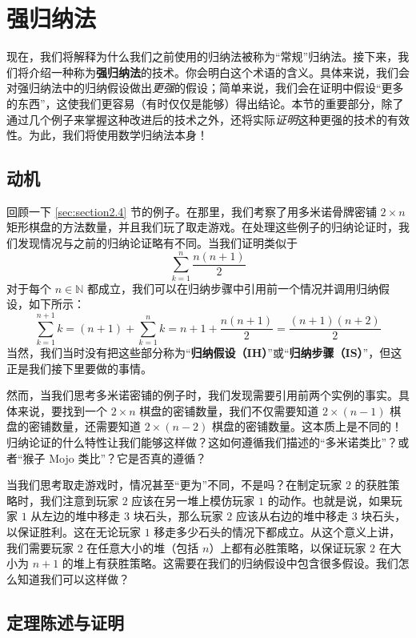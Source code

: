 \section{强归纳法}

现在，我们将解释为什么我们之前使用的归纳法被称为``常规''归纳法。接下来，我们将介绍一种称为\textbf{强归纳法}的技术。你会明白这个术语的含义。具体来说，我们会对强归纳法中的归纳假设做出\emph{更强}的假设；简单来说，我们会在证明中假设``更多的东西''，这使我们更容易（有时仅仅是能够）得出结论。本节的重要部分，除了通过几个例子来掌握这种改进后的技术之外，还将实际\emph{证明}这种更强的技术的有效性。为此，我们将使用数学归纳法本身！

\subsection{动机}

回顾一下 \ref{sec:section2.4} 节的例子。在那里，我们考察了用多米诺骨牌密铺 $2 \times n$ 矩形棋盘的方法数量，并且我们玩了取走游戏。在处理这些例子的归纳论证时，我们发现情况与之前的归纳论证略有不同。当我们证明类似于
\[\sum_{k=1}^{n} \frac{n(n+1)}{2}\]
对于每个 $n \in \mathbb{N}$ 都成立，我们可以在归纳步骤中引用前一个情况并调用归纳假设，如下所示：
\[\sum_{k=1}^{n+1} k=(n+1)+\sum_{k=1}^{n}k = n+1+\frac{n(n+1)}{2} = \frac{(n+1)(n+2)}{2} \]
当然，我们当时没有把这些部分称为``\textbf{归纳假设（IH）}''或``\textbf{归纳步骤（IS）}''，但这正是我们接下里要做的事情。

然而，当我们思考多米诺密铺的例子时，我们发现需要引用前两个实例的事实。具体来说，要找到一个 $2 \times n$ 棋盘的密铺数量，我们不仅需要知道 $2 \times (n-1)$ 棋盘的密铺数量，还需要知道 $2 \times (n-2)$ 棋盘的密铺数量。这本质上是不同的！归纳论证的什么特性让我们能够这样做？这如何遵循我们描述的``多米诺类比''？或者``猴子 Mojo 类比''？它是否真的遵循？

当我们思考取走游戏时，情况甚至``更为''不同，不是吗？在制定玩家 $2$ 的获胜策略时，我们注意到玩家 $2$ 应该在另一堆上模仿玩家 $1$ 的动作。也就是说，如果玩家 $1$ 从左边的堆中移走 $3$ 块石头，那么玩家 $2$ 应该从右边的堆中移走 $3$ 块石头，以保证胜利。这在无论玩家 $1$ 移走多少石头的情况下都成立。从这个意义上讲，我们需要玩家 $2$ 在任意大小的堆（包括 $n$）上都有必胜策略，以保证玩家 $2$ 在大小为 $n + 1$ 的堆上有获胜策略。这需要在我们的归纳假设中包含很多假设。我们怎么知道我们可以这样做？

\subsection{定理陈述与证明}\label{sec:section5.4.2}

